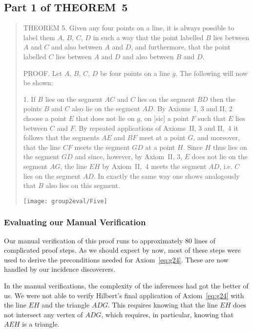 \subsection{Part 1 of THEOREM~5}
\begin{quotation}
THEOREM 5. Given any four points on a line, it is always possible to label them $A$, $B$, $C$, $D$ in such a way that the point labelled $B$ lies between $A$ and $C$ and also between $A$ and $D$, and furthermore, that the point labelled $C$ lies between $A$ and $D$ and also between $B$ and $D$.

PROOF. Let $A$, $B$, $C$, $D$ be four points on a line $g$. The following will now be shown:

1. If $B$ lies on the segment $AC$ and $C$ lies on the segment $BD$ then the points $B$ and $C$ also lie on the segment $AD$. By Axioms~I, 3 and II, 2 choose a point $E$ that does not lie on $g$, on [sic] a point $F$ such that $E$ lies between $C$ and $F$. By repeated applications of Axioms~II, 3 and II,~4 it follows that the segments $AE$ and $BF$ meet at a point $G$, and moreover, that the line $CF$ meets the segment $GD$ at a point $H$. Since $H$ thus lies on the segment $GD$ and since, however, by Axiom~II, 3, $E$ does not lie on the segment $AG$, the line $EH$ by Axiom~II,~4 meets the segment $AD$, i.e. $C$ lies on the segment $AD$. In exactly the same way one shows analogously that $B$ also lies on this segment.

\centering\texttt{[image: group2eval/Five]}
\end{quotation}

\subsubsection{Evaluating our Manual Verification}\label{sec:FindingAEH}
Our manual verification of this proof runs to approximately 80 lines of complicated proof steps. As we should expect by now, most of these steps were used to derive the preconditions needed for Axiom~\ref{eq:g24}. These are now handled by our incidence discoverers.

In the manual verifications, the complexity of the inferences had got the better of us. We were not able to verify Hilbert's final application of Axiom~\ref{eq:g24} with the line $EH$ and the triangle $ADG$. This requires knowing that the line $EH$ does not intersect any vertex of $ADG$, which requires, in particular, knowing that $AEH$ is a triangle.

